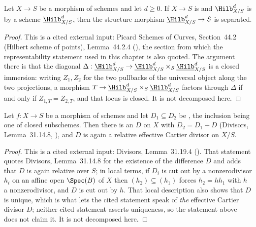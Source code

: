 \begin{lemma}
\label{lem:pc-hilb-separated}
Let $X\to S$ be a morphism of schemes and let $d\geq0$.  If $X\to S$ is
 and $\Hilb^d_{X/S}$ is
 by a scheme
$\underline{\Hilb}^d_{X/S}$, then the structure morphism
$\underline{\Hilb}^d_{X/S}\to S$ is separated.
\end{lemma}
\begin{proof}
This is a cited external input: Picard Schemes of Curves, Section~44.2
(Hilbert scheme of points), Lemma~44.2.4 (), the section
from which the representability statement used in this chapter is also
quoted.  The argument there is that the diagonal
$\Delta:\underline{\Hilb}^d_{X/S}\to
\underline{\Hilb}^d_{X/S}\times_S\underline{\Hilb}^d_{X/S}$ is a closed
immersion: writing $Z_1,Z_2$ for the two pullbacks of the universal object
along the two projections, a morphism $T\to
\underline{\Hilb}^d_{X/S}\times_S\underline{\Hilb}^d_{X/S}$ factors through
$\Delta$ if and only if $Z_{1,T}=Z_{2,T}$, and that locus is closed.  It is
not decomposed here.
\end{proof}

\begin{lemma}
\label{lem:pc-relative-cartier-difference}
Let $f:X\to S$ be a morphism of schemes and let $D_1\subseteq D_2$ be
, the inclusion being one of closed subschemes.  Then
there is an
$D$ on $X$ with $D_2=D_1+D$ (Divisors, Lemma~31.14.8,
), and $D$ is again
a relative effective Cartier divisor on $X/S$.
\end{lemma}
\begin{proof}
This is a cited external input: Divisors, Lemma~31.19.4
().  That
statement quotes Divisors, Lemma~31.14.8 for the existence of the
difference $D$ and adds that $D$ is again relative over $S$; in local
terms, if $D_i$ is cut out by a nonzerodivisor $h_i$ on an affine open
$\Spec(B)$ of $X$ then $(h_2)\subseteq(h_1)$ forces $h_2=hh_1$ with $h$
a nonzerodivisor, and $D$ is cut out by $h$.  That local description
also shows that $D$ is unique, which is what lets the cited statement
speak of \emph{the} effective Cartier divisor $D$; neither cited
statement asserts uniqueness, so the statement above does not claim it.
It is not decomposed here.
\end{proof}

